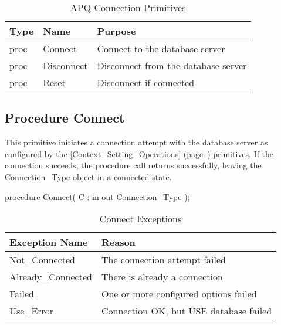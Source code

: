 \documentclass[english,letterpaper]{book}
\newcommand\Ref[1]{\textsection\ref{#1} (page~\pageref{#1})}
\begin{document}
\begin{table}
   \begin{center}
      \begin{tabular}{lll}
         Type     &  Name              &  Purpose\\
         \hline
         proc     &  Connect           &  Connect to the database server\\
         proc     &  Disconnect        &  Disconnect from the database server\\
         proc     &  Reset             &  Disconnect if connected\\
      \end{tabular}
   \end{center}
   \caption{APQ Connection Primitives}\label{t:conprims}
\end{table}

\subsection{Procedure Connect}

This primitive initiates a connection attempt with the database server
as configured by the \Ref{Context_Setting_Operations} primitives.
If the connection succeeds, the procedure call returns
successfully, leaving the Connection\_Type object in a connected state.


\begin{Code}
procedure Connect(
   C : in out Connection_Type
);
\end{Code}

\begin{table}
   \begin{center}
      \begin{tabular}{ll}
         Exception Name       &  Reason\\
         \hline 
         Not\_Connected       &  The connection attempt failed\\
         Already\_Connected   &  There is already a connection\\
         Failed               &  One or more configured options failed\\
         Use\_Error           &  Connection OK, but USE database failed\\
      \end{tabular}
   \end{center}
   \caption{Connect Exceptions}\label{t:conx}
\end{table}
\end{document}
